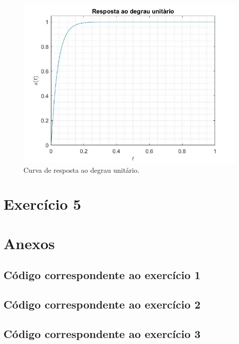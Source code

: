 \documentclass[a4paper,12pt,oneside,openany,table,xcdraw]{article}
\begin{document}
\vspace{0.2cm}
\begin{figure}[H]
\centering
\includegraphics[width=14cm]{ex4-st}
\caption{Curva de resposta ao degrau unitário.}
\label{ex4:st}
\end{figure}



\section{Exercício 5}

\newpage
\section{Anexos}
\subsection{Código correspondente ao exercício 1} \label{anexo:ex1}


\vspace{0.3cm}
\subsection{Código correspondente ao exercício 2} \label{anexo:ex2}


\vspace{0.3cm}
\subsection{Código correspondente ao exercício 3} \label{anexo:ex3}

\end{document}
